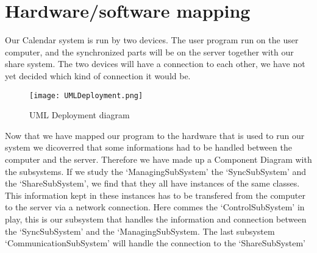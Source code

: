 \section{Hardware/software mapping}

Our Calendar system is run by two devices. The user program run on the user computer, and the synchronized parts will be on the server together with our share system. The two devices will have a connection to each other, we have not yet decided which kind of connection it would be.

\begin{figure}[h]
\centering
\texttt{[image: UMLDeployment.png]}
\caption{UML Deployment diagram \label{overflow}}
\label{figur:UMLDeployment}
\end{figure}

Now that we have mapped our program to the hardware that is used to run our system we dicoverred that some informations had to be handled between the computer and the server. Therefore we have made up a Component Diagram with the subsystems. If we study the ‘ManagingSubSystem’ the ‘SyncSubSystem’ and the ‘ShareSubSystem’, we find that they all have instances of the same classes. This information kept in these instances has to be transfered from the computer to the server via a network connection. Here commes the ‘ControlSubSystem’ in play, this is our subsystem that handles the information and connection between the ‘SyncSubSystem’ and the ‘ManagingSubSystem. The last subsystem ‘CommunicationSubSystem’ will handle the connection to the ‘ShareSubSystem’